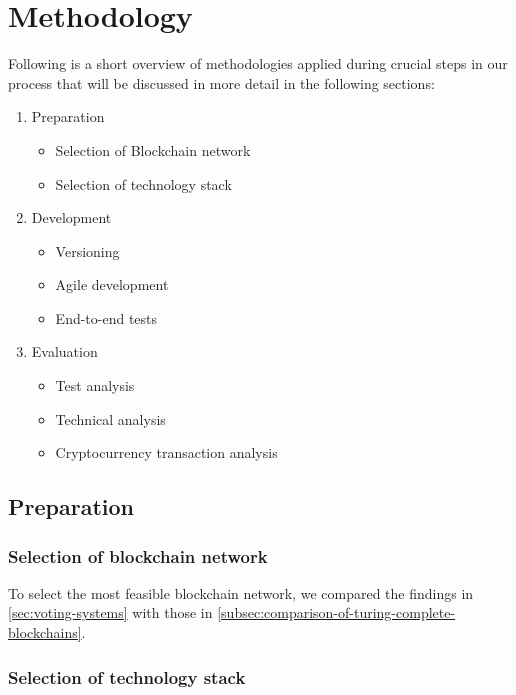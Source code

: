 \chapter{Methodology}\label{ch:methodology}

Following is a short overview of methodologies applied during crucial steps in our process that will be discussed in more detail in the following sections:

\begin{enumerate}
    \item Preparation
    \begin{itemize}
        \item Selection of \gls{Blockchain} network
        \item Selection of technology stack
    \end{itemize}
    \item Development
    \begin{itemize}
        \item Versioning
        \item Agile development
        \item End-to-end tests
    \end{itemize}
    \item Evaluation
    \begin{itemize}
        \item Test analysis
        \item Technical analysis
        \item Cryptocurrency transaction analysis
    \end{itemize}
\end{enumerate}

\section{Preparation}\label{sec:preparation}

\subsection{Selection of blockchain network}\label{subsec:selection-of-blockchain-network2}

To select the most feasible blockchain network, we compared the findings in \cref{sec:voting-systems} with those in \cref{subsec:comparison-of-turing-complete-blockchains}.

\subsection{Selection of technology stack}\label{subsec:selection-of-technology-stack}

